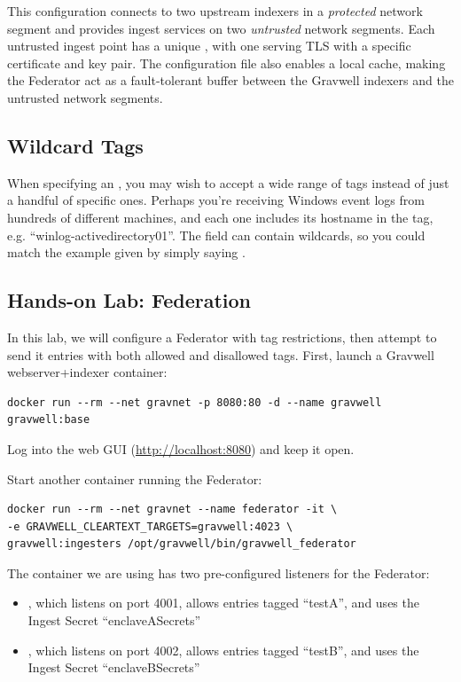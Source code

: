 This configuration connects to two upstream indexers in a
\emph{protected} network segment and provides ingest services on two
\emph{untrusted} network segments. Each untrusted ingest point has a unique
, with one serving TLS with a specific certificate and
key pair. The configuration file also enables a local cache, making the
Federator act as a fault-tolerant buffer between the Gravwell indexers
and the untrusted network segments.

\subsection{Wildcard Tags}

When specifying an , you may wish to accept a wide range of tags instead of just a handful of specific ones. Perhaps you're receiving Windows event logs from hundreds of different machines, and each one includes its hostname in the tag, e.g. ``winlog-activedirectory01''. The  field can contain wildcards, so you could match the example given by simply saying .

\subsection{Hands-on Lab: Federation}

In this lab, we will configure a Federator with tag restrictions, then
attempt to send it entries with both allowed and disallowed tags. First,
launch a Gravwell webserver+indexer container:

\begin{Verbatim}[breaklines=true]
docker run --rm --net gravnet -p 8080:80 -d --name gravwell gravwell:base
\end{Verbatim}

Log into the web GUI (\href{http://localhost:8080}{http://localhost:8080}) and keep it open.

Start another container running the Federator:

\begin{Verbatim}[breaklines=true]
docker run --rm --net gravnet --name federator -it \
-e GRAVWELL_CLEARTEXT_TARGETS=gravwell:4023 \
gravwell:ingesters /opt/gravwell/bin/gravwell_federator
\end{Verbatim}

The container we are using has two pre-configured listeners for the
Federator:

\begin{itemize}
\item
  , which listens on port 4001, allows entries tagged
  ``testA'', and uses the Ingest Secret ``enclaveASecrets''
\item
  \code{enclaveB}, which listens on port 4002, allows entries tagged
  ``testB'', and uses the Ingest Secret ``enclaveBSecrets''
\end{itemize}


